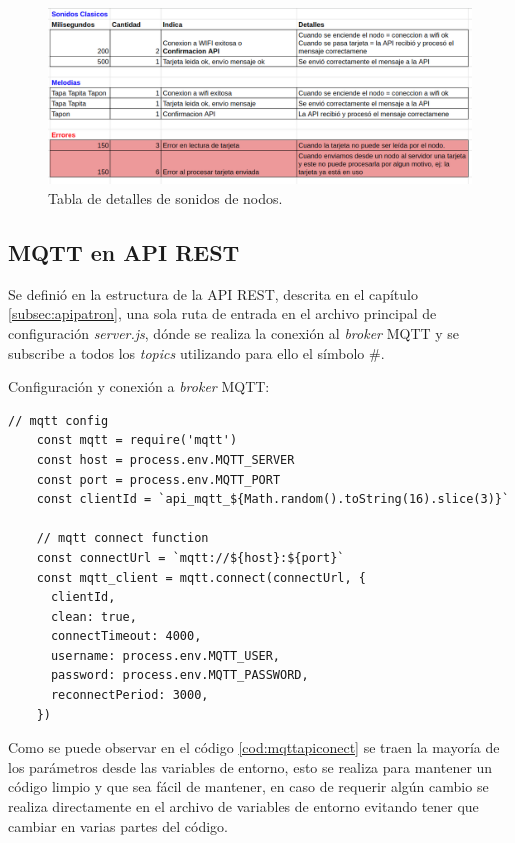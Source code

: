 \begin{figure}[H]
	\centering
	\includegraphics[scale=.40]{./Figures/mqtt-sonidos-nodos.png}
	\caption{Tabla de detalles de sonidos de nodos.}
	\label{fig:mqttsonidosnodos}
\end{figure}



\subsection{MQTT en API REST}
\label{subsec:mqttapi}

Se definió en la estructura de la API REST, descrita en el capítulo \ref{subsec:apipatron}, una sola ruta de entrada en el archivo principal de configuración \textit{server.js}, dónde se realiza la conexión al \textit{broker} MQTT y se subscribe a todos los \textit{topics} utilizando para ello el símbolo \#. 

Configuración y conexión a \textit{broker} MQTT:
\begin{lstlisting}[label=cod:mqttapiconect,caption= Configuración y conexión a \textit{broker} MQTT en API REST.]
 // mqtt config
    const mqtt = require('mqtt')
    const host = process.env.MQTT_SERVER
    const port = process.env.MQTT_PORT
    const clientId = `api_mqtt_${Math.random().toString(16).slice(3)}`
    
    // mqtt connect function
    const connectUrl = `mqtt://${host}:${port}`
    const mqtt_client = mqtt.connect(connectUrl, {
      clientId,
      clean: true,
      connectTimeout: 4000,
      username: process.env.MQTT_USER,
      password: process.env.MQTT_PASSWORD,
      reconnectPeriod: 3000,
    })
\end{lstlisting}

Como se puede observar en el código \ref{cod:mqttapiconect} se traen la mayoría de los parámetros desde las variables de entorno, esto se realiza para mantener un código limpio y que sea fácil de mantener, en caso de requerir algún cambio se realiza directamente en el archivo de variables de entorno evitando tener que cambiar en varias partes del código.

